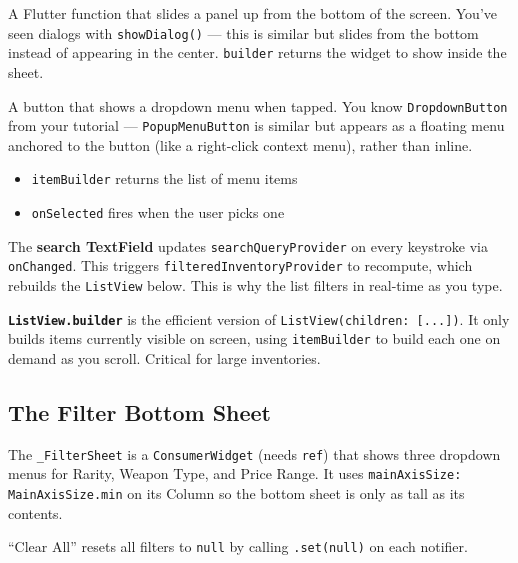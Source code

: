 \documentclass[11pt, a4paper]{article}
\begin{document}
\begin{conceptbox}[title=\textbf{showModalBottomSheet}]
A Flutter function that slides a panel up from the bottom of the screen. You've seen dialogs with \texttt{showDialog()} --- this is similar but slides from the bottom instead of appearing in the center. \texttt{builder} returns the widget to show inside the sheet.
\end{conceptbox}

\begin{conceptbox}[title=\textbf{PopupMenuButton}]
A button that shows a dropdown menu when tapped. You know \texttt{DropdownButton} from your tutorial --- \texttt{PopupMenuButton} is similar but appears as a floating menu anchored to the button (like a right-click context menu), rather than inline.
\begin{itemize}
    \item \texttt{itemBuilder} returns the list of menu items
    \item \texttt{onSelected} fires when the user picks one
\end{itemize}
\end{conceptbox}

The \textbf{search TextField} updates \texttt{searchQueryProvider} on every keystroke via \texttt{onChanged}. This triggers \texttt{filteredInventoryProvider} to recompute, which rebuilds the \texttt{ListView} below. This is why the list filters in real-time as you type.

\textbf{\texttt{ListView.builder}} is the efficient version of \texttt{ListView(children: [...])}. It only builds items currently visible on screen, using \texttt{itemBuilder} to build each one on demand as you scroll. Critical for large inventories.

\subsection{The Filter Bottom Sheet}

The \texttt{\_FilterSheet} is a \texttt{ConsumerWidget} (needs \texttt{ref}) that shows three dropdown menus for Rarity, Weapon Type, and Price Range. It uses \texttt{mainAxisSize: MainAxisSize.min} on its Column so the bottom sheet is only as tall as its contents.

``Clear All'' resets all filters to \texttt{null} by calling \texttt{.set(null)} on each notifier.
\end{document}
